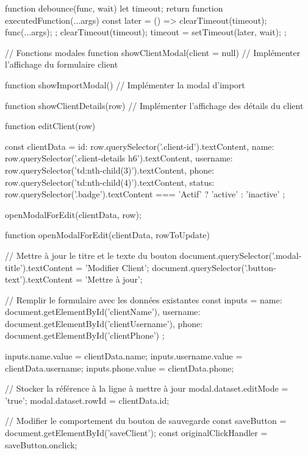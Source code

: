 {    function debounce(func, wait) {
        let timeout;
        return function executedFunction(...args) {
            const later = () => {
                clearTimeout(timeout);
                func(...args);
            };
            clearTimeout(timeout);
            timeout = setTimeout(later, wait);
        };
    }

    // Fonctions modales
    function showClientModal(client = null) {
        // Implémenter l'affichage du formulaire client
    }

    function showImportModal() {
        // Implémenter la modal d'import
    }

    function showClientDetails(row) {
        // Implémenter l'affichage des détails du client
    }

    function editClient(row) {
        const clientData = {
            id: row.querySelector('.client-id').textContent,
            name: row.querySelector('.client-details h6').textContent,
            username: row.querySelector('td:nth-child(3)').textContent,
            phone: row.querySelector('td:nth-child(4)').textContent,
            status: row.querySelector('.badge').textContent === 'Actif' ? 'active' : 'inactive'
        };

        openModalForEdit(clientData, row);
    }

    function openModalForEdit(clientData, rowToUpdate) {
        // Mettre à jour le titre et le texte du bouton
        document.querySelector('.modal-title').textContent = 'Modifier Client';
        document.querySelector('.button-text').textContent = 'Mettre à jour';
        
        // Remplir le formulaire avec les données existantes
        const inputs = {
            name: document.getElementById('clientName'),
            username: document.getElementById('clientUsername'),
            phone: document.getElementById('clientPhone')
        };

        inputs.name.value = clientData.name;
        inputs.username.value = clientData.username;
        inputs.phone.value = clientData.phone;

        // Stocker la référence à la ligne à mettre à jour
        modal.dataset.editMode = 'true';
        modal.dataset.rowId = clientData.id;

        // Modifier le comportement du bouton de sauvegarde
        const saveButton = document.getElementById('saveClient');
        const originalClickHandler = saveButton.onclick;
        
}}
